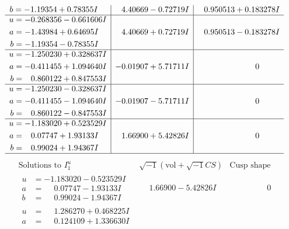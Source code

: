 \documentclass[1p]{elsarticle_modified}
\theoremstyle{definition}
\newcommand{\I}{\sqrt{-1}}
\begin{document}
$$\begin{array}{c|c|c}
\begin{aligned}
b &= -1.19354 + 0.78355 I\end{aligned}
 & \phantom{-}4.40669 - 0.72719 I & \phantom{-}0.950513 + 0.183278 I \\ \hline\begin{aligned}
u &= -0.268356 - 0.661606 I \\
a &= -1.43984 + 0.64695 I \\
b &= -1.19354 - 0.78355 I\end{aligned}
 & \phantom{-}4.40669 + 0.72719 I & \phantom{-}0.950513 - 0.183278 I \\ \hline\begin{aligned}
u &= -1.250230 + 0.328637 I \\
a &= -0.411455 + 1.094640 I \\
b &= \phantom{-}0.860122 + 0.847553 I\end{aligned}
 & -0.01907 + 5.71711 I & \phantom{-0.000000 } 0 \\ \hline\begin{aligned}
u &= -1.250230 - 0.328637 I \\
a &= -0.411455 - 1.094640 I \\
b &= \phantom{-}0.860122 - 0.847553 I\end{aligned}
 & -0.01907 - 5.71711 I & \phantom{-0.000000 } 0 \\ \hline\begin{aligned}
u &= -1.183020 + 0.523529 I \\
a &= \phantom{-}0.07747 + 1.93133 I \\
b &= \phantom{-}0.99024 + 1.94367 I\end{aligned}
 & \phantom{-}1.66900 + 5.42826 I & \phantom{-0.000000 } 0\\
 \hline 
 \end{array}$$\newpage$$\begin{array}{c|c|c}  
\text{Solutions to }I^u_{1}& \I (\text{vol} + \sqrt{-1}CS) & \text{Cusp shape}\\
 \hline 
\begin{aligned}
u &= -1.183020 - 0.523529 I \\
a &= \phantom{-}0.07747 - 1.93133 I \\
b &= \phantom{-}0.99024 - 1.94367 I\end{aligned}
 & \phantom{-}1.66900 - 5.42826 I & \phantom{-0.000000 } 0 \\ \hline\begin{aligned}
u &= \phantom{-}1.286270 + 0.468225 I \\
a &= \phantom{-}0.124109 + 1.336630 I \\

\end{aligned}
\end{array}$$
\end{document}
